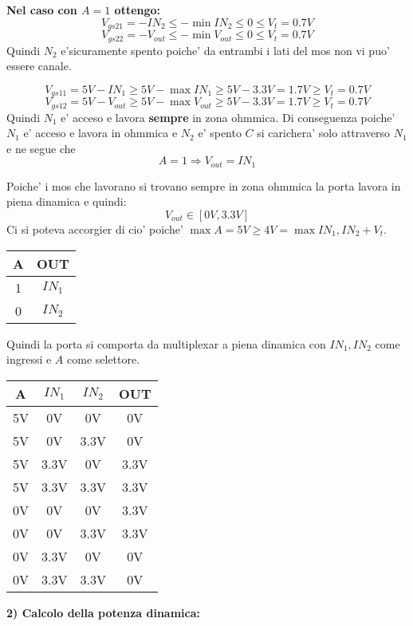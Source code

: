 \documentclass[\main/main.tex]{subfiles}
\begin{document}
\textbf{Nel caso con $A = 1$ ottengo:}
\[V_{gs21} =  - IN_2 \le -\min{IN_2} \le 0 \le V_t = 0.7V\]
\[V_{gs22} =  - V_{out} \le -\min{V_{out}} \le 0 \le V_t = 0.7V\]
Quindi $N_2$ e'sicuramente spento poiche' da entrambi i lati del mos non vi puo' essere canale.

\[V_{gs11} = 5V - IN_1\ge 5V - \max{IN_1} \ge 5V - 3.3V = 1.7V \ge V_t = 0.7V\]
\[V_{gs12} = 5V - V_{out}\ge 5V - \max{V_{out}} \ge 5V - 3.3V = 1.7V \ge V_t = 0.7V\]
Quindi $N_1$ e' acceso e lavora \textbf{sempre} in zona ohmmica.
Di conseguenza poiche' $N_1$ e' acceso e lavora in ohmmica e $N_2$ e' spento $C$ si carichera' solo attraverso $N_1$ e ne segue che  \[ A = 1 \Rightarrow V_{out} = IN_1\]

Poiche' i mos che lavorano si trovano sempre in zona ohmmica la porta lavora in piena dinamica e quindi:
\[V_{out} \in [0V,3.3V]\]
Ci si poteva accorgier di cio' poiche' $\max{A} = 5V \ge 4V = \max{IN_1,IN_2} + V_t$.

\begin{center}


\begin{tabular}{c | c}
    A & OUT\\
    \hline
    1 & $IN_1$\\
    0 & $IN_2$\\
\end{tabular}

Quindi la porta si comporta da multiplexar a piena dinamica
con $IN_1,IN_2$  come ingressi e $A$ come selettore.

\begin{tabular}{c c c| c }
    A & $IN_1$ & $IN_2$ & OUT\\
    \hline
    5V & 0V & 0V & 0V\\
    5V & 0V & 3.3V & 0V\\
    5V & 3.3V & 0V & 3.3V\\
    5V & 3.3V & 3.3V & 3.3V\\
    0V & 0V & 0V & 3.3V\\
    0V & 0V & 3.3V & 3.3V\\
    0V & 3.3V & 0V & 0V\\
    0V & 3.3V & 3.3V & 0V\\
\end{tabular}
\end{center}
\clearpage
\textbf{2) Calcolo della potenza dinamica:}
\end{document}
